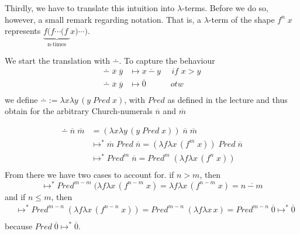 \documentclass{article}
\begin{document}
Thirdly, we have to translate this intuition into $\lambda$-terms. Before we do so, however, a small remark regarding notation. That is, a $\lambda$-term of the shape $f^n \; x$ represents $\underbrace{f(f \cdots(f \; }_{\text{n-times}}x) \cdots)$. 

We start the translation with $\dotminus$. To capture the behaviour
\begin{equation*}
\begin{split}
\dotminus \; \overline{x} \; \overline{y} &\mapsto \overline{x-y} \quad \textit{  if } x>y \\
\dotminus \; \overline{x} \; \overline{y} &\mapsto \overline{0} \quad \quad \quad \textit{otw }\\
\end{split}
\end{equation*}
we define $\dotminus := \lambda x \lambda y \,(y \; \textit{Pred} \; x)$, with $\textit{Pred}$ as defined in the lecture and thus obtain for the arbitrary Church-numerals $\overline{n}$ and $\overline{m}$ 

\begin{equation*}
\begin{split}
\dotminus \; \overline{n} \; \overline{m} &= (\lambda x \lambda y \,(y \; \textit{Pred} \; x)) \; \overline{n} \; \overline{m} \\
& \mapsto^* \overline{m} \; \textit{Pred} \; \overline{n} = (\lambda f \lambda x \, (f^m \; x)) \; \textit{Pred} \; \overline{n} \\
& \mapsto^* \textit{Pred}^m \; \overline{n} =  \textit{Pred}^m \; (\lambda f \lambda x \, (f^n \; x)) \\
\end{split}
\end{equation*}
From there we have two cases to account for.
if $n>m$, then
\begin{equation*}
\mapsto^* \textit{Pred}^{m-m} \; (\lambda f \lambda x \, (f^{n-m} \; x) = \lambda f \lambda x \, (f^{n-m} \; x) = \overline{n-m}
\end{equation*}
and if $n \leq m$, then
\begin{equation*}
\begin{split}
&\mapsto^* \textit{Pred}^{m-n} \;( \lambda f \lambda x \, (f^{n-n} \; x)) = \textit{Pred}^{m-n} \; (\lambda f \lambda x \, x)
=  \textit{Pred}^{m-n} \; \overline{0} \mapsto^* \overline{0}\\
 \end{split}
\end{equation*}
because $Pred \; \overline{0} \mapsto^* \overline{0}$.
\end{document}

